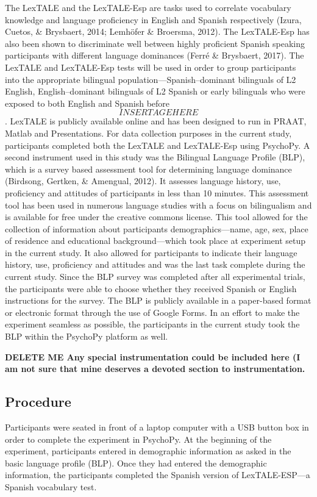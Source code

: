 The LexTALE and the LexTALE-Esp are tasks used to correlate vocabulary knowledge and language proficiency in English and Spanish respectively (Izura, Cuetos, \& Brysbaert, 2014; Lemhöfer \& Broersma, 2012). The LexTALE-Esp has also been shown to discriminate well between highly proficient Spanish speaking participants with different language dominances (Ferré \& Brysbaert, 2017). The LexTALE and LexTALE-Esp tests will be used in order to group participants into the appropriate bilingual population—Spanish–dominant bilinguals of L2 English, English–dominant bilinguals of L2 Spanish or early bilinguals who were exposed to both English and Spanish before \[INSERT AGE HERE\]. LexTALE is publicly available online and has been designed to run in PRAAT, Matlab and Presentations. For data collection purposes in the current study, participants completed both the LexTALE and LexTALE-Esp using PsychoPy. 
A second instrument used in this study was the Bilingual Language Profile (BLP), which is a survey based assessment tool for determining language dominance (Birdsong, Gertken, \& Amengual, 2012). It assesses language history, use, proficiency and attitudes of participants in less than 10 minutes. This assessment tool has been used in numerous language studies with a focus on bilingualism and is available for free under the creative commons license. This tool allowed for the collection of information about participants demographics---name, age, sex, place of residence and educational background---which took place at experiment setup in the current study. It also allowed for participants to indicate their language history, use, proficiency and attitudes and was the last task complete during the current study. Since the BLP survey was completed after all experimental trials, the participants were able to choose whether they received Spanish or English instructions for the survey. The BLP is publicly available in a paper-based format or electronic format through the use of Google Forms. In an effort to make the experiment seamless as possible, the participants in the current study took the BLP within the PsychoPy platform as well. 


\textbf{DELETE ME Any special instrumentation could be included here (I am not sure that mine deserves a devoted section to instrumentation.}


\subsection{Procedure}
Participants were seated in front of a laptop computer with a USB button box in order to complete the experiment in PsychoPy. At the beginning of the experiment, participants entered in demographic information as asked in the basic language profile (BLP). Once they had entered the demographic information, the participants completed the Spanish version of LexTALE-ESP---a Spanish vocabulary test. 

